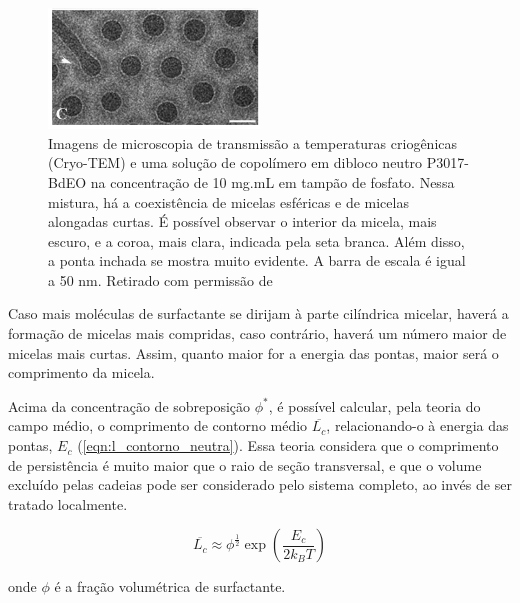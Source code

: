 		\begin{figure}[h]
			\centering
			\includegraphics[width=0.5\textwidth]{imagens/artigos/Cryo_TEM_Pontas_Danino_2009}
			\caption{Imagens de microscopia de transmissão a temperaturas criogênicas (Cryo-TEM) e uma solução de copolímero em dibloco neutro P3017-BdEO na concentração de 10 mg.mL\menosUm{} em tampão de fosfato. Nessa mistura, há a coexistência de micelas esféricas e de micelas alongadas curtas. É possível observar o interior da micela, mais escuro, e a coroa, mais clara, indicada pela seta branca. Além disso, a ponta inchada se mostra muito evidente. A barra de escala é igual a 50 nm. Retirado com permissão de \citeauthor{Shimoni2009}}
			\label{fig:pontas_inchadas_danino2009}
		\end{figure} 
				
		Caso mais moléculas de surfactante se dirijam à parte cilíndrica micelar, haverá a formação de micelas mais compridas, caso contrário, haverá um número maior de micelas mais curtas. Assim, quanto maior for a energia das pontas, maior será o comprimento da micela.\cite{May2001a}
		
		Acima da concentração de sobreposição \(\phi^*\), é possível calcular, pela teoria do campo médio, o comprimento de contorno médio \(\overline{L_c}\), relacionando-o à energia das pontas, \(E_c\) (\autoref{eqn:l_contorno_neutra})\cite{Cates1990}. Essa teoria considera que o comprimento de persistência é muito maior que o raio de seção transversal, e que o volume excluído pelas cadeias pode ser considerado pelo sistema completo, ao invés de ser tratado localmente.
		 
		
		\begin{equation}
			\overline{L_c} \approx \phi^{\frac{1}{2}} \exp \left(\dfrac{E_c}{2k_BT}\right)
			\label{eqn:l_contorno_neutra}
		\end{equation} %
		
		\noindent onde \(\phi\) é a fração volumétrica de surfactante. 
		
